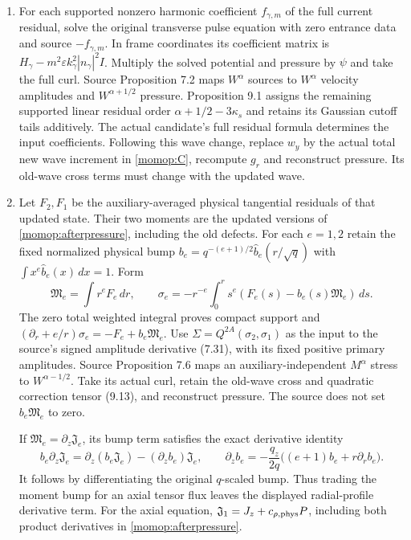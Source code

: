 \begin{enumerate}
\item For each supported nonzero harmonic coefficient $f_{\gamma,m}$
of the full current residual, solve the original transverse pulse
equation with zero entrance data and source $-f_{\gamma,m}$.
In frame coordinates its coefficient matrix is
$H_\gamma-m^2\varepsilon k_\gamma^2|n_\gamma|^2I$.
Multiply the solved potential and pressure by $\psi$ and take the
full curl. Source Proposition 7.2 maps $W^\alpha$ sources to
$W^\alpha$ velocity amplitudes and $W^{\alpha+1/2}$ pressure.
Proposition 9.1 assigns the remaining supported linear residual
order $\alpha+1/2-3\kappa_s$ and retains its Gaussian cutoff tails
additively. The actual candidate's full residual formula determines
the input coefficients. Following this wave change, replace $w_y$
by the actual total new wave increment in \eqref{momop:C}, recompute
$g_r$ and reconstruct pressure. Its old-wave cross terms must change
with the updated wave.

\item Let $F_2,F_1$ be the auxiliary-averaged physical tangential
residuals of that updated state. Their two moments are the updated
versions of \eqref{momop:afterpressure}, including the old defects.
For each $e=1,2$ retain the fixed normalized physical bump
$b_e=q^{-(e+1)/2}\widehat b_e(r/\sqrt q)$ with
$\int x^e\widehat b_e(x)\,dx=1$. Form
\[
 \mathfrak M_e=\int r^eF_e\,dr,\qquad
 \sigma_e=-r^{-e}\int_0^r s^e
                         (F_e(s)-b_e(s)\mathfrak M_e)\,ds .
\]
The zero total weighted integral proves compact support and
$(\partial_r+e/r)\sigma_e=-F_e+b_e\mathfrak M_e$.
Use $\Sigma=Q^{2A}(\sigma_2,\sigma_1)$ as the input to the
source's signed amplitude derivative (7.31), with its fixed
positive primary amplitudes. Source Proposition 7.6 maps an
auxiliary-independent $M^\alpha$ stress to $W^{\alpha-1/2}$.
Take its actual curl, retain the old-wave cross and quadratic
correction tensor (9.13), and reconstruct pressure. The source
does not set $b_e\mathfrak M_e$ to zero.

If $\mathfrak M_e=\partial_z\mathfrak J_e$, its bump term satisfies
the exact derivative identity
\[
 b_e\partial_z\mathfrak J_e
 =\partial_z(b_e\mathfrak J_e)-(\partial_zb_e)\mathfrak J_e,\qquad
 \partial_zb_e=-\frac{q_z}{2q}
                    \bigl((e+1)b_e+r\partial_rb_e\bigr).
\]
It follows by differentiating the original $q$-scaled bump.
Thus trading the moment bump for an axial tensor flux leaves the
displayed radial-profile derivative term. For the axial equation,
$\mathfrak J_1=J_z+c_{\rho,\rm phys}P$, including both product
derivatives in \eqref{momop:afterpressure}.


\end{enumerate}
